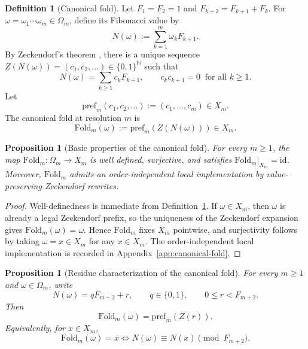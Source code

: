 \documentclass[11pt,letterpaper]{article}
\numberwithin{equation}{section}
\theoremstyle{plain}
\newtheorem{proposition}[theorem]{Proposition}
\theoremstyle{definition}
\newtheorem{definition}[theorem]{Definition}
\theoremstyle{remark}
\newcommand{\Fold}{\mathrm{Fold}}
\newcommand{\pref}{\mathrm{pref}}
\begin{document}
\begin{definition}[Canonical fold]\label{def:canonical-fold}
Let \(F_1=F_2=1\) and \(F_{k+2}=F_{k+1}+F_k\). For
\(\omega=\omega_1\cdots\omega_m\in\Omega_m\), define its Fibonacci value by
\[
N(\omega):=\sum_{k=1}^m \omega_k F_{k+1}.
\]
By Zeckendorf's theorem \cite{Zeckendorf1972}, there is a unique sequence
\(Z(N(\omega))=(c_1,c_2,\dots)\in\{0,1\}^{\mathbb{N}}\) such that
\[
N(\omega)=\sum_{k\ge 1} c_k F_{k+1},
\qquad
c_kc_{k+1}=0\ \text{ for all }k\ge 1.
\]
Let
\[
\pref_m(c_1,c_2,\dots):=(c_1,\dots,c_m)\in X_m.
\]
The canonical fold at resolution \(m\) is
\[
\Fold_m(\omega):=\pref_m(Z(N(\omega)))\in X_m.
\]
\end{definition}

\begin{proposition}[Basic properties of the canonical fold]\label{prop:canonical-fold-basic}
For every \(m\ge 1\), the map \(\Fold_m:\Omega_m\to X_m\) is well defined,
surjective, and satisfies \(\Fold_m|_{X_m}=\mathrm{id}\). Moreover,
\(\Fold_m\) admits an order-independent local implementation by
value-preserving Zeckendorf rewrites.
\end{proposition}

\begin{proof}
Well-definedness is immediate from Definition~\ref{def:canonical-fold}. If
\(\omega\in X_m\), then \(\omega\) is already a legal Zeckendorf prefix, so the
uniqueness of the Zeckendorf expansion gives \(\Fold_m(\omega)=\omega\). Hence
\(\Fold_m\) fixes \(X_m\) pointwise, and surjectivity follows by taking
\(\omega=x\in X_m\) for any \(x\in X_m\). The order-independent local
implementation is recorded in Appendix~\ref{app:canonical-fold}.
\end{proof}

\begin{proposition}[Residue characterization of the canonical fold]\label{prop:fold-residue-characterization}
For every \(m\ge 1\) and \(\omega\in\Omega_m\), write
\[
N(\omega)=qF_{m+2}+r,
\qquad q\in\{0,1\},
\qquad 0\le r<F_{m+2}.
\]
Then
\[
\Fold_m(\omega)=\pref_m(Z(r)).
\]
Equivalently, for \(x\in X_m\),
\[
\Fold_m(\omega)=x
\iff
N(\omega)\equiv N(x)\pmod{F_{m+2}}.
\]
\end{proposition}
\end{document}
